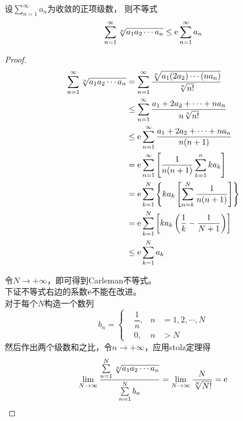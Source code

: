 \begin{proposition}[Carleman不等式]

    设$\sum\limits_{n = 1}^{\infty}{a_n}$为收敛的正项级数，
    则不等式
    \[\sum\limits_{n = 1}^{\infty}{\sqrt[n]{a_1 a_2 \cdots a_n}} \leq \mathrm{e} \sum\limits_{n = 1}^{\infty}{a_n}\]

\end{proposition}

\begin{proof}

    \begin{align*}
        \sum\limits_{n = 1}^{\infty}{\sqrt[n]{a_1 a_2 \cdots a_n}} & = \sum\limits_{n = 1}^{\infty}{\dfrac{\sqrt[n]{a_1 (2a_2) \cdots (na_n)}}{\sqrt[n]{n!}}} \\
        & \leq \sum\limits_{n = 1}^{\infty}{\dfrac{a_1 + 2a_2 + \cdots + na_n}{n\sqrt[n]{n!}}} \\
        & \leq \mathrm{e} \sum\limits_{n = 1}^{\infty}{\dfrac{a_1 + 2a_2 + \cdots + na_n}{n(n + 1)}} \\
        & = \mathrm{e} \sum\limits_{n = 1}^{\infty}{\left[ \dfrac{1}{n(n + 1)} \sum\limits_{k = 1}^{n}{ka_k} \right]} \\
        & = \mathrm{e} \sum\limits_{k = 1}^{N}{\left\{ ka_k\left[ \sum\limits_{n = k}^{N}{\dfrac{1}{n(n + 1)}} \right] \right\}} \\
        & = \mathrm{e} \sum\limits_{k = 1}^{N}{\left[ ka_k \left( \dfrac{1}{k} - \dfrac{1}{N + 1} \right) \right]} \\
        & \leq \mathrm{e} \sum\limits_{k = 1}^{N}{a_k}
    \end{align*}

    令$N\to+\infty$，即可得到\textup{Carleman}不等式。\\
    下证不等式右边的系数$\mathrm{e}$不能在改进。\\
    对于每个$N$构造一个数列
    \[
        b_n = \left\{
        \begin{aligned}
            & \dfrac{1}{n}, & n & = 1, 2, \cdots, N \\
            & 0, & n & > N
        \end{aligned}
        \right.
    \]
    然后作出两个级数和之比，令$n\to+\infty$，应用\textup{stolz}定理得
    \[\lim\limits_{N \to \infty}{\dfrac{\sum\limits_{n = 1}^{N}{\sqrt[n]{a_1 a_2 \cdots a_n}}}{\sum\limits_{n = 1}^{N}{b_n}}} = \lim\limits_{N \to \infty}{\dfrac{N}{\sqrt[N]{N!}}} = \mathrm{e}\]

\end{proof}


